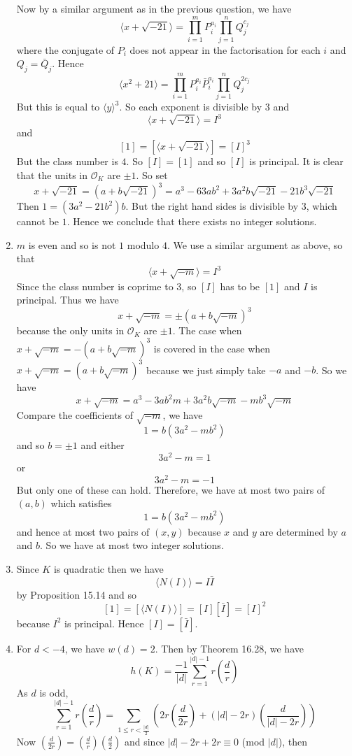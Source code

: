 \begin{enumerate}
Now by a similar argument as in the previous question, we have
$$\langle x+\sqrt{-21} \rangle=\prod_{i=1}^m P^{a_i}_i \prod_{j=1}^n Q^{c_j}_j$$
where the conjugate of $P_i$ does not appear in the factorisation for each $i$ and $Q_j =\bar{Q}_j$.
Hence
$$\langle x^2+21 \rangle=\prod_{i=1}^m P^{a_i}_i \bar{P}^{a_i}_i \prod_{j=1}^n Q^{2c_j}_j$$
But this is equal to $\langle y \rangle^3$. So each exponent is divisible by $3$ and
$$\langle x+\sqrt{-21} \rangle=I^3$$
and
$$[1]=[\langle x+\sqrt{-21} \rangle]=[I]^3$$
But the class number is $4$. So $[I]=[1]$ and so $[I]$ is principal.
It is clear that the units in $\mathcal{O}_K$ are $\pm 1$. So set
$$x+\sqrt{-21}=(a+b\sqrt{-21})^3=a^3-63ab^2 +3a^2b\sqrt{-21}-21b^3\sqrt{-21}$$
Then $1=(3a^2-21b^2)b$. But the right hand sides is divisible by $3$, which cannot be $1$. Hence we conclude that there exists no integer solutions.\\
\item $m$ is even and so is not $1$ modulo $4$. We use a similar argument as above, so that
$$\langle x+\sqrt{-m} \rangle=I^3$$
Since the class number is coprime to $3$, so $[I]$ has to be $[1]$ and $I$ is principal.
Thus we have
$$x+\sqrt{-m}=\pm(a+b\sqrt{-m})^3$$
because the only units in $\mathcal{O}_K$ are $\pm 1$.
The case when $x+\sqrt{-m}=-(a+b\sqrt{-m})^3$ is covered in the case
when $x+\sqrt{-m}=(a+b\sqrt{-m})^3$ because we just simply take $-a$ and $-b$.
So we have
$$x+\sqrt{-m}=a^3-3ab^2m+3a^2b\sqrt{-m}-mb^3\sqrt{-m}$$
Compare the coefficients of $\sqrt{-m}$, we have
$$1=b(3a^2-mb^2)$$
and so $b= \pm 1$ and either
$$3a^2-m=1$$
or
$$3a^2-m=-1$$
But only one of these can hold. Therefore, we have at most two pairs of $(a,b)$ which satisfies
$$1=b(3a^2-mb^2)$$
and hence at most two pairs of $(x,y)$ because $x$ and $y$ are determined by $a$ and $b$. So we have
at most two integer solutions.\\
\item Since $K$ is quadratic then we have
$$\langle N(I) \rangle=I\bar{I}$$ by Proposition 15.14 and so
$$[1]=[\langle N(I) \rangle]=[I][\bar{I}]=[I]^2$$
because $I^2$ is principal. Hence $[I]=[\bar{I}]$.\\
\item For $d<-4$, we have $w(d)=2$. Then by Theorem 16.28, we have
$$h(K)=\frac{-1}{|d|}\sum_{r=1}^{|d|-1}r\left(\frac{d}{r}\right)$$
As $d$ is odd,
$$\sum_{r=1}^{|d|-1}r\left(\frac{d}{r}\right)=\sum_{1 \le r <\frac{|d|}{2}}\left(2r\left(\frac{d}{2r}\right)
+(|d|-2r)\left(\frac{d}{|d|-2r}\right)\right)$$
Now $(\frac{d}{2r})=(\frac{d}{r})(\frac{d}{2})$ and since $|d|-2r +2r \equiv 0$ (mod $|d|$), then

\end{enumerate}

